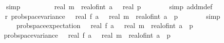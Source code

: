 \begin{isabellebody}
\ \ \ \ \ \ \isamarkupfalse%
\ simp\isanewline
\ \ \ \ \isamarkupfalse%
\ \isamarkupfalse%
\ {\isachardoublequoteopen}{\isachardot}{\kern0pt}{\isachardot}{\kern0pt}{\isachardot}{\kern0pt}\ {\isacharequal}{\kern0pt}\ real\ m\ {\isacharasterisk}{\kern0pt}\ {\isacharparenleft}{\kern0pt}real{\isacharunderscore}{\kern0pt}of{\isacharunderscore}{\kern0pt}int\ a\ {\isacharplus}{\kern0pt}\ {}{\isacharparenright}{\kern0pt}\ {\isacharslash}{\kern0pt}real\ p{\isachardoublequoteclose}\isanewline
\ \ \ \ \ \ \isamarkupfalse%
\ {\isacharparenleft}{\kern0pt}simp\ add{\isacharcolon}{\kern0pt}m{\isacharunderscore}{\kern0pt}def{\isacharparenright}{\kern0pt}\isanewline
\ \ \ \ \isamarkupfalse%
\ \isamarkupfalse%
\ r{\isacharunderscore}{\kern0pt}{}{\isacharcolon}{\kern0pt}\ {\isachardoublequoteopen}prob{\isacharunderscore}{\kern0pt}space{\isachardot}{\kern0pt}variance\ {\isasymOmega}\ {\isacharparenleft}{\kern0pt}{\isasymlambda}{\isasymomega}{\isachardot}{\kern0pt}\ real\ {\isacharparenleft}{\kern0pt}f\ a\ {\isasymomega}{\isacharparenright}{\kern0pt}{\isacharparenright}{\kern0pt}\ {\isasymle}\ real\ m\ {\isacharasterisk}{\kern0pt}\ {\isacharparenleft}{\kern0pt}real{\isacharunderscore}{\kern0pt}of{\isacharunderscore}{\kern0pt}int\ a{\isacharplus}{\kern0pt}{}{\isacharparenright}{\kern0pt}\ {\isacharslash}{\kern0pt}\ p{\isachardoublequoteclose}\isanewline
\ \ \ \ \ \ \isamarkupfalse%
\ simp\isanewline
\ \ \ \ \isamarkupfalse%
\isanewline
\ \ \ \ \ \ {\isachardoublequoteopen}prob{\isacharunderscore}{\kern0pt}space{\isachardot}{\kern0pt}expectation\ {\isasymOmega}\ {\isacharparenleft}{\kern0pt}{\isasymlambda}{\isasymomega}{\isachardot}{\kern0pt}\ real\ {\isacharparenleft}{\kern0pt}f\ a\ {\isasymomega}{\isacharparenright}{\kern0pt}{\isacharparenright}{\kern0pt}\ {\isacharequal}{\kern0pt}\ real\ m\ {\isacharasterisk}{\kern0pt}\ {\isacharparenleft}{\kern0pt}real{\isacharunderscore}{\kern0pt}of{\isacharunderscore}{\kern0pt}int\ a{\isacharplus}{\kern0pt}{}{\isacharparenright}{\kern0pt}\ {\isacharslash}{\kern0pt}\ p\ {\isasymand}\isanewline
\ \ \ \ \ \ \ prob{\isacharunderscore}{\kern0pt}space{\isachardot}{\kern0pt}variance\ {\isasymOmega}\ {\isacharparenleft}{\kern0pt}{\isasymlambda}{\isasymomega}{\isachardot}{\kern0pt}\ real\ {\isacharparenleft}{\kern0pt}f\ a\ {\isasymomega}{\isacharparenright}{\kern0pt}{\isacharparenright}{\kern0pt}\ {\isasymle}\ real\ m\ {\isacharasterisk}{\kern0pt}\ {\isacharparenleft}{\kern0pt}real{\isacharunderscore}{\kern0pt}of{\isacharunderscore}{\kern0pt}int\ a{\isacharplus}{\kern0pt}{}{\isacharparenright}{\kern0pt}\ {\isacharslash}{\kern0pt}\ p{\isachardoublequoteclose}\isanewline

\end{isabellebody}
